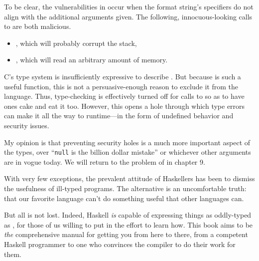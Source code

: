 \documentclass[book.tex]{subfiles}
\begin{document}
To be clear, the vulnerabilities in  occur when the format string's
specifiers do not align with the additional arguments given. The following,
innocuous-looking calls to  are both malicious.

\begin{itemize}
  \item{, which will probably corrupt the stack,}
  \item{, which will read an arbitrary amount of memory.}
\end{itemize}

C's type system is insufficiently expressive to describe . But
because  is such a useful function, this is not a persuasive-enough
reason to exclude it from the language. Thus, type-checking is effectively
turned off for calls to  so as to have ones cake and eat it too.
However, this opens a hole through which type errors can make it all the way to
runtime---in the form of undefined behavior and security issues.

My opinion is that preventing security holes is a much more important aspect of
the types, over ``\texttt{null} is the billion dollar mistake'' or whichever
other arguments are in vogue today. We will return to the problem of
 in chapter 9.


With very few exceptions, the prevalent attitude of Haskellers has been to
dismiss the usefulness of ill-typed programs. The alternative is an
uncomfortable truth: that our favorite language can't do something useful that
other languages can.

But all is not lost. Indeed, Haskell \emph{is} capable of expressing things as
oddly-typed as , for those of us willing to put in the effort to
learn how. This book aims to be \emph{the} comprehensive manual for getting you
from here to there, from a competent Haskell programmer to one who convinces the
compiler to do their work for them.
\end{document}
